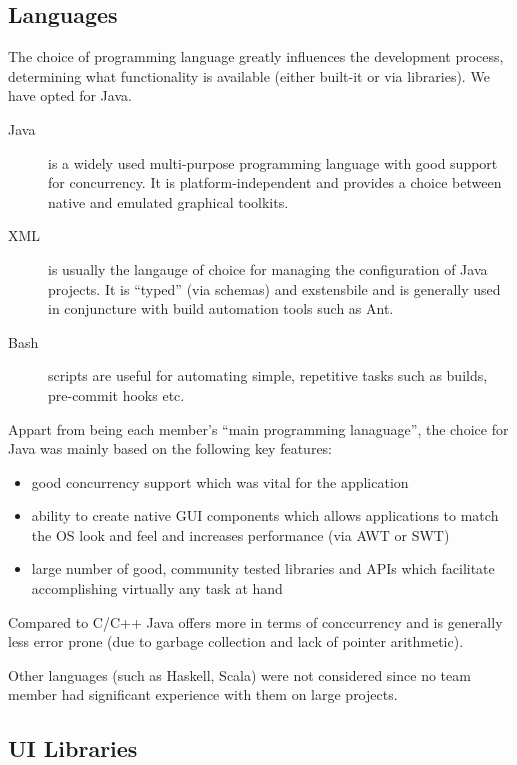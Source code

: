 \documentclass[10pt]{report}
\begin{document}
\subsection{Languages}

The choice of programming language greatly influences the development process, determining what functionality is available (either built-it or via libraries). We have opted for Java.

\begin{description}
\item[Java] is a widely used multi-purpose programming language with good support for concurrency. It is platform-independent and provides a choice between native and emulated graphical toolkits. 

\item[XML] is usually the langauge of choice for managing the configuration of Java projects. It is ``typed'' (via schemas) and exstensbile and is generally used in conjuncture with build automation tools such as Ant.

\item[Bash] scripts are useful for automating simple, repetitive tasks such as builds, pre-commit hooks etc.

\end{description}

Appart from being each member's ``main programming lanaguage'', the choice for Java was mainly based on the following key features:
\begin{itemize}
  \item good concurrency support which was vital for the application 
  \item ability to create native GUI components which allows applications to match the OS look and feel and increases performance (via AWT or SWT)
  \item large number of good, community tested libraries and APIs which facilitate accomplishing virtually any task at hand
\end{itemize}

Compared to C/C++ Java offers more in terms of conccurrency and is generally less error prone (due to garbage collection and lack of pointer arithmetic).

Other languages (such as Haskell, Scala) were not considered since no team member had significant experience with them on large projects.

\subsection{UI Libraries} 
\end{document}
